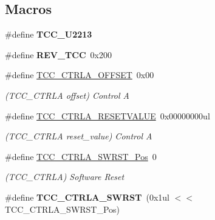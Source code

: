 \subsection*{Macros}
\begin{DoxyCompactItemize}
\item 
\hypertarget{group___s_a_m_l21___t_c_c_ga6a9d28db8007997bffcac44b61490736}{}\#define {\bfseries T\+C\+C\+\_\+\+U2213}\label{group___s_a_m_l21___t_c_c_ga6a9d28db8007997bffcac44b61490736}

\item 
\hypertarget{group___s_a_m_l21___t_c_c_gaebed198ffbf9f32715f416fb2f528090}{}\#define {\bfseries R\+E\+V\+\_\+\+T\+C\+C}~0x200\label{group___s_a_m_l21___t_c_c_gaebed198ffbf9f32715f416fb2f528090}

\item 
\hypertarget{group___s_a_m_l21___t_c_c_ga490235e97163aab24774d4047a42146a}{}\#define \hyperlink{group___s_a_m_l21___t_c_c_ga490235e97163aab24774d4047a42146a}{T\+C\+C\+\_\+\+C\+T\+R\+L\+A\+\_\+\+O\+F\+F\+S\+E\+T}~0x00\label{group___s_a_m_l21___t_c_c_ga490235e97163aab24774d4047a42146a}

\begin{DoxyCompactList}\small\item\em (T\+C\+C\+\_\+\+C\+T\+R\+L\+A offset) Control A \end{DoxyCompactList}\item 
\hypertarget{group___s_a_m_l21___t_c_c_ga626994013261f03cdd178bf0330181b0}{}\#define \hyperlink{group___s_a_m_l21___t_c_c_ga626994013261f03cdd178bf0330181b0}{T\+C\+C\+\_\+\+C\+T\+R\+L\+A\+\_\+\+R\+E\+S\+E\+T\+V\+A\+L\+U\+E}~0x00000000ul\label{group___s_a_m_l21___t_c_c_ga626994013261f03cdd178bf0330181b0}

\begin{DoxyCompactList}\small\item\em (T\+C\+C\+\_\+\+C\+T\+R\+L\+A reset\+\_\+value) Control A \end{DoxyCompactList}\item 
\hypertarget{group___s_a_m_l21___t_c_c_ga3416ebea8df3dc57824e307a83935eed}{}\#define \hyperlink{group___s_a_m_l21___t_c_c_ga3416ebea8df3dc57824e307a83935eed}{T\+C\+C\+\_\+\+C\+T\+R\+L\+A\+\_\+\+S\+W\+R\+S\+T\+\_\+\+Pos}~0\label{group___s_a_m_l21___t_c_c_ga3416ebea8df3dc57824e307a83935eed}

\begin{DoxyCompactList}\small\item\em (T\+C\+C\+\_\+\+C\+T\+R\+L\+A) Software Reset \end{DoxyCompactList}\item 
\hypertarget{group___s_a_m_l21___t_c_c_ga46e9565a13d9b61ecbcba6b0757e91c1}{}\#define {\bfseries T\+C\+C\+\_\+\+C\+T\+R\+L\+A\+\_\+\+S\+W\+R\+S\+T}~(0x1ul $<$$<$ T\+C\+C\+\_\+\+C\+T\+R\+L\+A\+\_\+\+S\+W\+R\+S\+T\+\_\+\+Pos)\label{group___s_a_m_l21___t_c_c_ga46e9565a13d9b61ecbcba6b0757e91c1}


\end{DoxyCompactItemize}
